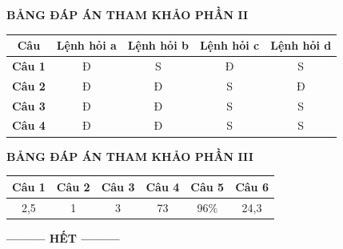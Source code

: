 \documentclass[12pt,a4paper]{article}
\begin{document}
\bigskip
\noindent\textbf{\large BẢNG ĐÁP ÁN THAM KHẢO PHẦN II}
\vspace{0.2cm}

\noindent
\begin{center}
\begin{tabular}{|c|c|c|c|c|}
\hline
\textbf{Câu} & \textbf{Lệnh hỏi a} & \textbf{Lệnh hỏi b} & \textbf{Lệnh hỏi c} & \textbf{Lệnh hỏi d} \\
\hline
\textbf{Câu 1} & Đ & S & Đ & S \\
\hline
\textbf{Câu 2} & Đ & Đ & S & Đ \\
\hline
\textbf{Câu 3} & Đ & Đ & S & S \\
\hline
\textbf{Câu 4} & Đ & Đ & S & S \\
\hline
\end{tabular}
\end{center}

\bigskip
\noindent\textbf{\large BẢNG ĐÁP ÁN THAM KHẢO PHẦN III}
\vspace{0.2cm}

\noindent
\begin{center}
\begin{tabular}{|c|c|c|c|c|c|}
\hline
\textbf{Câu 1} & \textbf{Câu 2} & \textbf{Câu 3} & \textbf{Câu 4} & \textbf{Câu 5} & \textbf{Câu 6} \\
\hline
2{,}5 & 1 & 3 & 73 & 96\% & 24{,}3 \\
\hline
\end{tabular}
\end{center}

\begin{center}
\textbf{--------- HẾT ---------}
\end{center}
\end{document}
